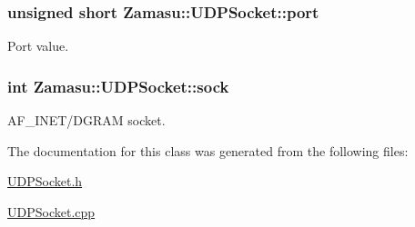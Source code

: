 \subsubsection[{\texorpdfstring{port}{port}}]{\setlength{\rightskip}{0pt plus 5cm}unsigned short Zamasu\+::\+U\+D\+P\+Socket\+::port\hspace{0.3cm}{\ttfamily [protected]}}\hypertarget{class_zamasu_1_1_u_d_p_socket_ad03f2d80351b790709530b19a7b5d82f}{}\label{class_zamasu_1_1_u_d_p_socket_ad03f2d80351b790709530b19a7b5d82f}


Port value. 

\subsubsection[{\texorpdfstring{sock}{sock}}]{\setlength{\rightskip}{0pt plus 5cm}int Zamasu\+::\+U\+D\+P\+Socket\+::sock\hspace{0.3cm}{\ttfamily [protected]}}\hypertarget{class_zamasu_1_1_u_d_p_socket_a91c6d34ba12289baf09c2de151beee97}{}\label{class_zamasu_1_1_u_d_p_socket_a91c6d34ba12289baf09c2de151beee97}


A\+F\+\_\+\+I\+N\+E\+T/\+D\+G\+R\+AM socket. 



The documentation for this class was generated from the following files\+:\begin{DoxyCompactItemize}
\item 
\hyperlink{_u_d_p_socket_8h}{U\+D\+P\+Socket.\+h}\item 
\hyperlink{_u_d_p_socket_8cpp}{U\+D\+P\+Socket.\+cpp}\end{DoxyCompactItemize}
